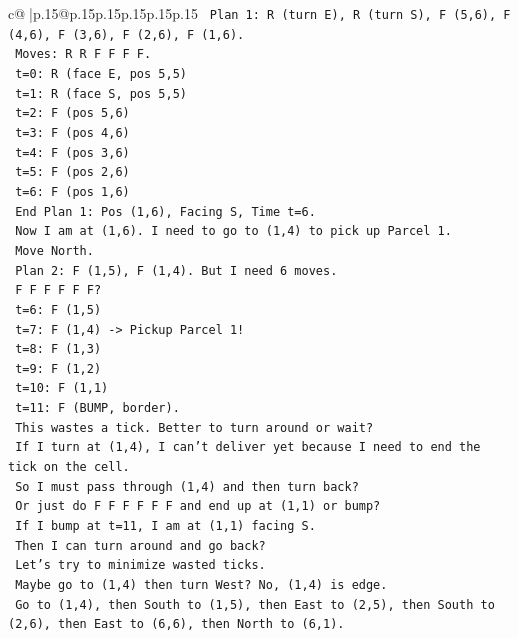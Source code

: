 \documentclass{article}
\begin{document}
{\begin{supertabular}{c@{$\;$}|p{.15\linewidth}@{}p{.15\linewidth}p{.15\linewidth}p{.15\linewidth}p{.15\linewidth}p{.15\linewidth}}
{{{\texttt{      Plan 1: R (turn E), R (turn S), F (5,6), F (4,6), F (3,6), F (2,6), F (1,6).} \\
\texttt{      Moves: R R F F F F.} \\
\texttt{      t=0: R (face E, pos 5,5)} \\
\texttt{      t=1: R (face S, pos 5,5)} \\
\texttt{      t=2: F (pos 5,6)} \\
\texttt{      t=3: F (pos 4,6)} \\
\texttt{      t=4: F (pos 3,6)} \\
\texttt{      t=5: F (pos 2,6)} \\
\texttt{      t=6: F (pos 1,6)} \\
\texttt{      End Plan 1: Pos (1,6), Facing S, Time t=6.} \\
\texttt{      Now I am at (1,6). I need to go to (1,4) to pick up Parcel 1.} \\
\texttt{      Move North.} \\
\texttt{      Plan 2: F (1,5), F (1,4). But I need 6 moves.} \\
\texttt{      F F F F F F?} \\
\texttt{      t=6: F (1,5)} \\
\texttt{      t=7: F (1,4) {-}> Pickup Parcel 1!} \\
\texttt{      t=8: F (1,3)} \\
\texttt{      t=9: F (1,2)} \\
\texttt{      t=10: F (1,1)} \\
\texttt{      t=11: F (BUMP, border).} \\
\texttt{      This wastes a tick. Better to turn around or wait?} \\
\texttt{      If I turn at (1,4), I can't deliver yet because I need to end the tick on the cell.} \\
\texttt{      So I must pass through (1,4) and then turn back?} \\
\texttt{      Or just do F F F F F F and end up at (1,1) or bump?} \\
\texttt{      If I bump at t=11, I am at (1,1) facing S.} \\
\texttt{      Then I can turn around and go back?} \\
\texttt{      Let's try to minimize wasted ticks.} \\
\texttt{      Maybe go to (1,4) then turn West? No, (1,4) is edge.} \\
\texttt{      Go to (1,4), then South to (1,5), then East to (2,5), then South to (2,6), then East to (6,6), then North to (6,1).} \\
}}}
\end{supertabular}}
\end{document}
